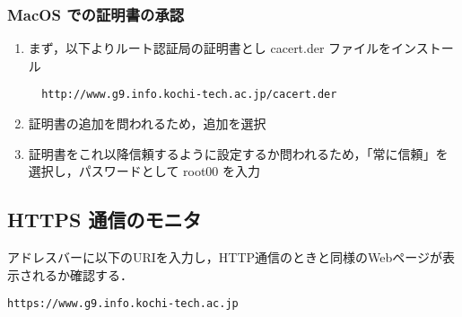 \documentclass[a4j,titlepage]{jarticle}
\begin{document}
\subsubsection{MacOS での証明書の承認}
\begin{enumerate}
\item まず，以下よりルート認証局の証明書とし cacert.der ファイルをインストール
  \begin{center}
    \begin{screen}
\begin{verbatim}
  http://www.g9.info.kochi-tech.ac.jp/cacert.der
\end{verbatim}
    \end{screen}
  \end{center}

\item 証明書の追加を問われるため，追加を選択

\item 証明書をこれ以降信頼するように設定するか問われるため，「常に信頼」を選択し，パスワードとして root00 を入力
\end{enumerate}


\subsection{HTTPS 通信のモニタ}
 
アドレスバーに以下のURIを入力し，HTTP通信のときと同様のWebページが表示されるか確認する．
\begin{screen}
\begin{center}
\begin{verbatim}
https://www.g9.info.kochi-tech.ac.jp
\end{verbatim}
\end{center}
\end{screen}


\newpage
\end{document}
